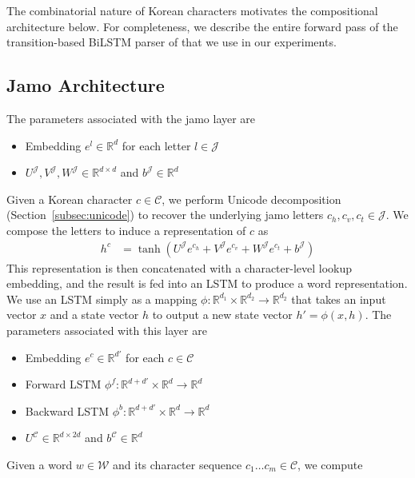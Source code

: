 \documentclass[11pt,letterpaper]{article}
\newcommand{\R}{\ensuremath{\mathbb{R}}}
\newcommand{\ra}{\ensuremath{\rightarrow}}
\newcommand{\paren}[1]{\left(#1\right)}
\newcommand{\by}{\ensuremath{\times}}
\begin{document}
\begin{CJK}{UTF8}{gbsn}
The combinatorial nature of Korean characters motivates the compositional architecture below.
For completeness, we describe the entire forward pass of the transition-based BiLSTM parser of  that we use in our experiments.



\subsection{Jamo Architecture}

The parameters associated with the jamo layer are
\begin{itemize}
\item Embedding $e^l \in \R^d$ for each letter $l \in \mathcal{J}$
\item $U^{\mathcal{J}}, V^{\mathcal{J}}, W^{\mathcal{J}} \in \R^{d \by d}$ and $b^{\mathcal{J}} \in \R^d$
\end{itemize}
Given a Korean character $c \in \mathcal{C}$, we perform Unicode decomposition (Section~\ref{subsec:unicode}) to
recover the underlying jamo letters $c_h, c_v, c_t \in \mathcal{J}$.
We compose the letters to induce a representation of $c$ as
\begin{align*}
h^c &= \tanh\paren{U^{\mathcal{J}} e^{c_h} + V^{\mathcal{J}} e^{c_v} + W^{\mathcal{J}} e^{c_t} + b^{\mathcal{J}}}
\end{align*}
This representation is then concatenated with a character-level lookup embedding,
and the result is fed into an LSTM to produce a word representation.
We use an LSTM \cite{hochreiter1997long} simply as a mapping $\phi:\R^{d_1} \times \R^{d_2} \ra \R^{d_2}$
that takes an input vector $x$ and a state vector $h$ to output a new state vector $h' = \phi(x, h)$.
The parameters associated with this layer are
\begin{itemize}
\item Embedding $e^c \in \R^{d'}$ for each $c \in \mathcal{C}$
\item Forward LSTM $\phi^f: \R^{d + d'} \times \R^d \ra \R^d$
\item Backward LSTM $\phi^b: \R^{d + d'}\times \R^d  \ra \R^d$
\item $U^{\mathcal{C}} \in \R^{d \by 2 d}$ and $b^{\mathcal{C}} \in \R^d$
\end{itemize}
Given a word $w \in \mathcal{W}$ and its character sequence $c_1 \ldots c_m \in \mathcal{C}$,
we compute

\end{CJK}
\end{document}
